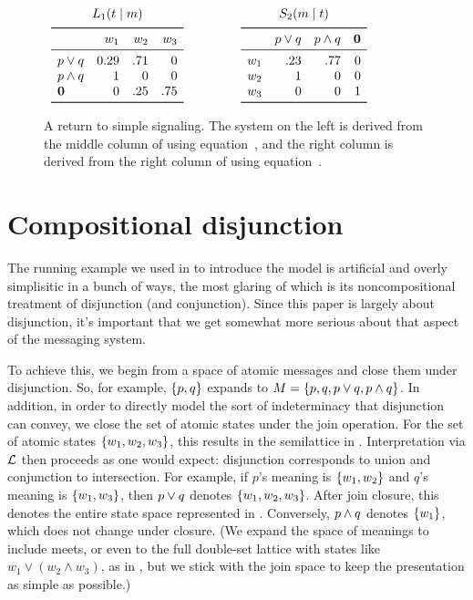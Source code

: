 \documentclass{article}
\begin{document}
\begin{figure}[tp]
  \centering
  $\begin{array}[c]{c@{\hspace{45pt}}c}
     \ListenerK[1](\state\given\msg) & \SpeakerK[2](\msg\given\state) \\[1ex] %
     \listenerMatrix%
     {}%
     { 0.29 & .71 & 0}
     { 1 &   0 &  0}
     {0 &  .25 & .75}
     & 
     \speakerMatrix%
     {}%
     {.23 &  .77  &   0}%
     {1   &  0  &     0}%
     {0   &  0  &   1}
   \end{array}$
   \caption{A return to simple signaling. The system on the left is
     derived from the middle column of  using
     equation~, and the right column is derived from the
     right column of  using
     equation~.}
  \label{fig:simple}
\end{figure}


\section{Compositional disjunction}\label{sec:composition}

The running example we used in  to introduce the
model is artificial and overly simplisitic in a bunch of ways, the
most glaring of which is its noncompositional treatment of disjunction
(and conjunction). Since this paper is largely about disjunction, it's
important that we get somewhat more serious about that aspect of the
messaging system.

To achieve this, we begin from a space of atomic messages and close
them under disjunction. So, for example, $\left\{ p, q \right\}$ expands to
$M = \left\{ p, q, p \vee q, p \wedge q \right\}$. In addition, in order to
directly model the sort of indeterminacy that disjunction can convey,
we close the set of atomic states under the join operation.  For the
set of atomic states $\left\{ w_{1}, w_{2}, w_{3} \right\}$, this results in the
semilattice in . Interpretation via $\mathcal{L}$ then
proceeds as one would expect: disjunction corresponds to union and
conjunction to intersection. For example, if $p$'s meaning is
$\left\{ w_{1}, w_{2} \right\}$ and $q$'s meaning is $\left\{ w_{1}, w_{3} \right\}$, then
$p \vee q$ denotes $\left\{ w_{1}, w_{2}, w_{3} \right\}$.  After join closure, this
denotes the entire state space represented in
. Conversely, $p \wedge q$ denotes $\left\{ w_{1} \right\}$,
which does not change under closure. (We expand the space of meanings
to include meets, or even to the full double-set lattice with states
like $w_{1} \vee (w_{2} \wedge w_{3})$, as in
\citealt{levy-pollard:2001}, but we stick with the join space to keep
the presentation as simple as possible.)
\end{document}
